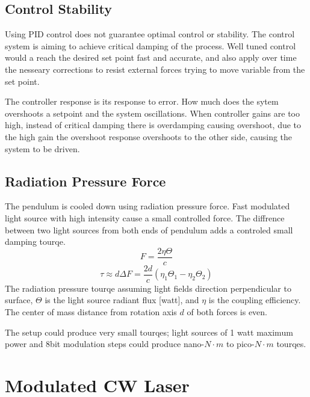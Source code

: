 \documentclass[\main/master.tex]{subfiles}
\begin{document}
\subsection{Control Stability}
Using PID control does not guarantee optimal control or stability. The control system is aiming to achieve critical damping of the process. Well tuned control would a reach the desired set point fast and accurate, and also apply over time the nesseary corrections to resist external forces trying to move variable from the set point.
\par
The controller response is its response to error. How much does the sytem overshoots a setpoint and the system oscillations. When controller gains are too high, instead of critical damping there is overdamping causing overshoot, due to the high gain the overshoot response overshoots to the other side, causing the system to be driven.
\subsection{Radiation Pressure Force}
The pendulum is cooled down using radiation pressure force. Fast modulated light source with high intensity cause a small controlled force. The diffrence between two light sources from both ends of pendulum adds a controled small damping tourqe. 
\begin{equation}
F = \frac{2\eta\Theta}{{c}} \label{eqn:radiation force}
\end{equation}
\begin{equation}
\tau\approx d\Delta F = \frac{2d}{{c}} (\eta_1\Theta_1 -\eta_2\Theta_2) \label{eqn:radiation tourqe}
\end{equation}
The radiation pressure tourqe assuming light fields direction perpendicular to surface, $\Theta$ is the light source radiant flux [watt], and $\eta$ is the coupling efficiency. The center of mass distance from rotation axis $d$ of both forces is even.
\par
The setup could produce very small tourqes; light sources of 1 watt maximum power and 8bit modulation steps could produce nano-$N\cdot m$ to pico-$N\cdot m$ tourqes. 










\section{Modulated CW Laser}
\end{document}
